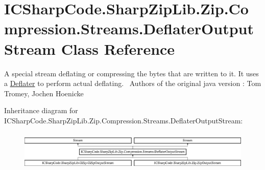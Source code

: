 \hypertarget{class_i_c_sharp_code_1_1_sharp_zip_lib_1_1_zip_1_1_compression_1_1_streams_1_1_deflater_output_stream}{}\section{I\+C\+Sharp\+Code.\+Sharp\+Zip\+Lib.\+Zip.\+Compression.\+Streams.\+Deflater\+Output\+Stream Class Reference}
\label{class_i_c_sharp_code_1_1_sharp_zip_lib_1_1_zip_1_1_compression_1_1_streams_1_1_deflater_output_stream}


A special stream deflating or compressing the bytes that are written to it. It uses a \hyperlink{class_i_c_sharp_code_1_1_sharp_zip_lib_1_1_zip_1_1_compression_1_1_deflater}{Deflater} to perform actual deflating.~\newline
 Authors of the original java version \+: Tom Tromey, Jochen Hoenicke  


Inheritance diagram for I\+C\+Sharp\+Code.\+Sharp\+Zip\+Lib.\+Zip.\+Compression.\+Streams.\+Deflater\+Output\+Stream\+:\begin{figure}[H]
\begin{center}
\leavevmode
\includegraphics[height=1.891892cm]{class_i_c_sharp_code_1_1_sharp_zip_lib_1_1_zip_1_1_compression_1_1_streams_1_1_deflater_output_stream}
\end{center}
\end{figure}
